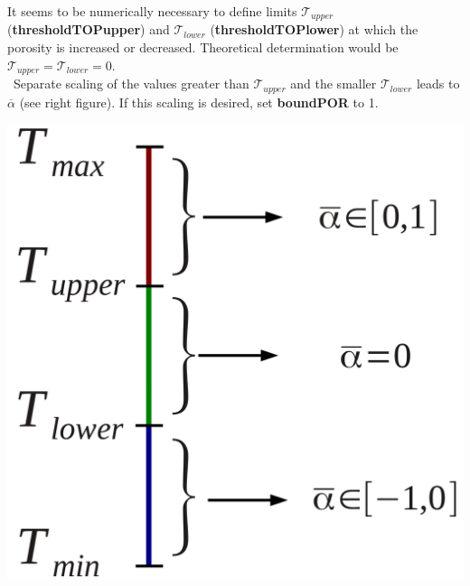 \documentclass[oneside]{article}
\numberwithin{equation}{section}
\numberwithin{figure}{section}
\newcommand{\TT }{ \mathcal{T}}
\numberwithin{figure}{section}
\begin{document}
\begin{minipage}[b]{9.2 cm}
    It seems to be numerically necessary to define limits $\TT_{upper}$ (\textbf{thresholdTOPupper}) and $\TT_{lower}$ (\textbf{thresholdTOPlower}) at which the porosity is increased or decreased. 
    Theoretical determination would be $\TT_{upper}=\TT_{lower}=0$.\\\
    Separate scaling of the values greater than $\TT_{upper}$ and the smaller $\TT_{lower}$ leads to $\overline{\alpha}$ (see right figure).
    If this scaling is desired, set \textbf{boundPOR} to 1.
\end{minipage}
\begin{minipage}[b]{3.5 cm}
    \centering
    \includegraphics[scale=0.16]{TOPscale.png}
\end{minipage}
\end{document}
